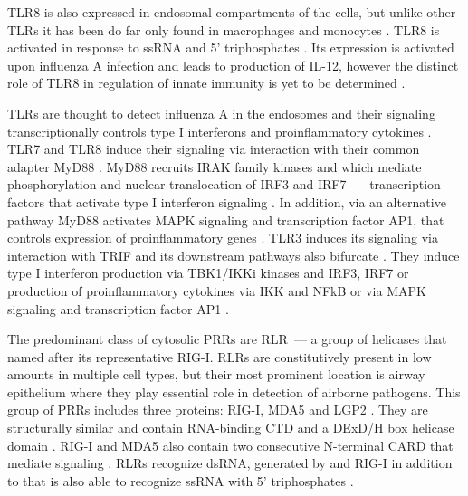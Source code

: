 		\gls{TLR}8 is also expressed in endosomal compartments of the cells, but unlike other \gls{TLR}s it has been do far only found in macrophages and monocytes \parencite{Ablasser2009}. \gls{TLR}8 is activated in response to ssRNA and 5' triphosphates \parencite{Ablasser2009}. Its expression is activated upon influenza A infection and leads to production of \gls{IL}-12, however the distinct role of \gls{TLR}8 in regulation of innate immunity is yet to be determined \parencite{Lee2013a}.
		
		\gls{TLR}s are thought to detect influenza A in the endosomes and their signaling transcriptionally controls type I interferons and proinflammatory cytokines \parencite{Kawai2007}. TLR7 and TLR8 induce their signaling via interaction with their common adapter MyD88 \parencite{Medzhitov1998}. MyD88 recruits IRAK family kinases and which mediate phosphorylation and nuclear translocation of \gls{IRF}3 and \gls{IRF}7~--- transcription factors that activate type I interferon signaling \parencite{Burns2003, Honda2005a}. In addition, via an alternative pathway MyD88 activates \gls{MAPK} signaling and transcription factor \gls{AP1}, that controls expression of proinflammatory genes \parencite{Kawai2007}. TLR3 induces its signaling via interaction with \gls{TRIF} and its downstream pathways also bifurcate \parencite{Guillot2005, Kumar2009}.	They induce type I interferon production via TBK1/IKKi kinases and \gls{IRF}3, \gls{IRF}7 or production of proinflammatory cytokines via \gls{IKK} and \gls{NFkB} or via \gls{MAPK} signaling and transcription factor \gls{AP1} \parencite{Guillot2005, Vercammen2008}.  
		 
		The predominant class of cytosolic PRRs are \gls{RLR}~--- a group of helicases that named after its representative \gls{RIG-I}.  \gls{RLR}s are constitutively present in low amounts in multiple cell types, but their most prominent location is airway epithelium \parencite{Bogefors2011} where they play essential role in detection of airborne pathogens. This group of \gls{PRR}s includes three proteins: \gls{RIG-I}, \gls{MDA5} and \gls{LGP2} \parencite{Kang2004, Yoneyama2004, Yoneyama2005}. They are structurally similar and contain RNA-binding \gls{CTD} and a DExD/H box helicase domain \parencite{Cui2008, Takahasi2009}. \gls{RIG-I} and \gls{MDA5} also contain two consecutive N-terminal \gls{CARD} that mediate signaling \parencite{Yoneyama2004, Kang2004}. \gls{RLR}s recognize dsRNA, generated by  and \gls{RIG-I} in addition to that is also able to recognize ssRNA with 5' triphosphates \parencite{Cui2008}. 
		

